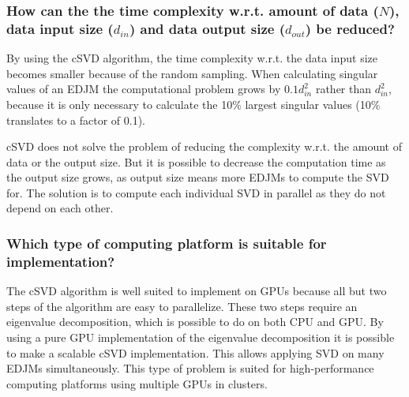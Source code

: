 \subsubsection*{How can the the time complexity w.r.t. amount of data ($N$), data input size ($d_{in}$) and data output size ($d_{out}$) be reduced?}

By using the cSVD algorithm, the time complexity w.r.t. the data input size becomes smaller because of the random sampling. When calculating singular values of an EDJM the computational problem grows by $0.1d_{in}^2$ rather than $d_{in}^2$, because it is only necessary to calculate the 10\% largest singular values (10\% translates to a factor of 0.1).

cSVD does not solve the problem of reducing the complexity w.r.t. the amount of data or the output size. But it is possible to decrease the computation time as the output size grows, as output size means more EDJMs to compute the SVD for. The solution is to compute each individual SVD in parallel as they do not depend on each other.

\subsubsection*{Which type of computing platform is suitable for implementation?}

The cSVD algorithm is well suited to implement on GPUs because all but two steps of the algorithm are easy to parallelize. These two steps require an eigenvalue decomposition, which is possible to do on both CPU and GPU. By using a pure GPU implementation of the eigenvalue decomposition it is possible to make a scalable cSVD implementation. This allows applying SVD on many EDJMs simultaneously. This type of problem is suited for high-performance computing platforms using multiple GPUs in clusters.